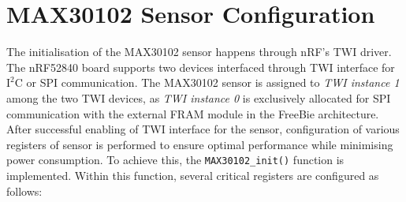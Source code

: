     
    


\section{MAX30102 Sensor Configuration}
\label{sec:sensor_config}
The initialisation of the MAX30102 sensor happens through nRF's TWI driver. The nRF52840 board \cite{nRF52840} supports two devices interfaced through TWI interface for \(\text{I}^2\text{C}\) or SPI communication. The MAX30102 sensor is assigned to \textit{TWI instance 1} among the two TWI devices, as \textit{TWI instance 0} is exclusively allocated for SPI communication with the external FRAM module in the FreeBie architecture. After successful enabling of TWI interface for the sensor, configuration of various registers of sensor is performed to ensure optimal performance while minimising power consumption. To achieve this, the \texttt{MAX30102\_init()} function is implemented. Within this function, several critical registers are configured as follows:

